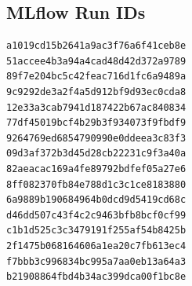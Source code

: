\documentclass[12pt,a4paper]{article}
\begin{document}
\subsection*{MLflow Run IDs}

\begin{lstlisting}
a1019cd15b2641a9ac3f76a6f41ceb8e
51accee4b3a94a4cad48d42d372a9789
89f7e204bc5c42feac716d1fc6a9489a
9c9292de3a2f4a5d912bf9d93ec0cda8
12e33a3cab7941d187422b67ac840834
77df45019bcf4b29b3f934073f9fbdf9
9264769ed6854790990e0ddeea3c83f3
09d3af372b3d45d28cb22231c9f3a40a
82aeacac169a4fe89792bdfef05a27e6
8ff082370fb84e788d1c3c1ce8183880
6a9889b190684964b0dcd9d5419cd68c
d46dd507c43f4c2c9463bfb8bcf0cf99
c1b1d525c3c3479191f255af54b8425b
2f1475b068164606a1ea20c7fb613ec4
f7bbb3c996834bc995a7aa0eb13a64a3
b21908864fbd4b34ac399dca00f1bc8e
\end{lstlisting}
\end{document}
